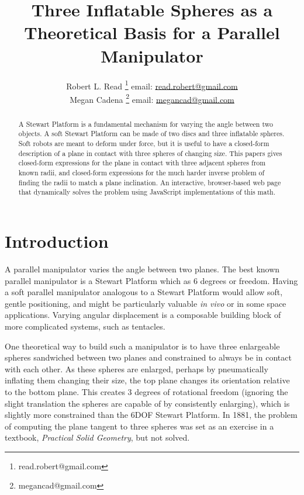 \documentclass{article}
\title{Three Inflatable Spheres as a Theoretical Basis for a Parallel Manipulator}
\author{Robert L. Read
  \thanks{read.robert@gmail.com}
  email: \href{mailto:read.robert@gmail.com}{read.robert@gmail.com}\\
Megan Cadena
  \thanks{megancad@gmail.com}
  email: \href{mailto:megancad@gmail.com}{megancad@gmail.com}
  }
\begin{document}
\maketitle

\begin{abstract}
  A Stewart Platform\cite{wiki:stewart} is a fundamental mechanism for varying the angle
  between two objects.
  A soft Stewart Platform can be made of two discs and
  three inflatable spheres.
  Soft robots are meant to deform under force, but it is useful to have
  a closed-form description of a plane in contact with three spheres of changing size.
  This papers gives closed-form expressions for the plane in contact with
  three adjacent spheres from known radii, and closed-form expressions for
  the much harder inverse problem of finding the radii to match a plane inclination.
  An interactive,
  browser-based web page that dynamically solves the problem\cite{softrobotcalc}
  using JavaScript implementations of this math.
\end{abstract}


\section{Introduction}

A parallel manipulator varies the angle between two planes.
The best known parallel manipulator is
a Stewart Platform\cite{wiki:stewart} which as 6 degrees or freedom.
Having a soft parallel manipulator analogous to a Stewart Platform would allow soft,
gentle positioning,
and might be particularly valuable {\it in vivo}\cite{white2018soft} or in some space applications\cite{glassner2020soft}.
Varying angular displacement is a composable building block of more complicated systems, such as tentacles.

One theoretical way to build such a manipulator is to have three enlargeable spheres sandwiched between two planes
and constrained to always be in contact with each other.
As these spheres are enlarged, perhaps by pneumatically inflating them changing
their size, the top plane changes its orientation relative to the bottom plane.
This creates 3 degrees of rotational freedom
(ignoring the slight translation the spheres are capable of by consistently enlarging),
which is slightly more constrained than the 6DOF Stewart Platform.
In 1881, the problem of computing the plane tangent to three spheres was
set as an exercise in a textbook, {\em Practical Solid Geometry}\cite{payne1881},
but not solved.
\end{document}

